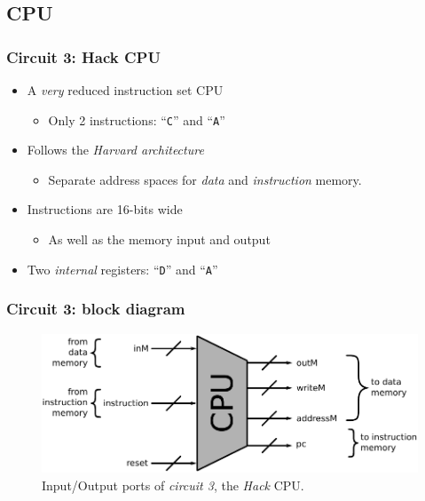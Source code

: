 \documentclass{beamer}
\begin{document}
        \subsection{CPU}
        \label{subsec:cpu}
            \begin{frame}
                \frametitle{Circuit 3: Hack CPU}

                \begin{itemize}
                    \item A \emph{very} reduced instruction set CPU
                        \begin{itemize}
                            \item Only 2 instructions: ``\texttt{C}'' and ``\texttt{A}''
                        \end{itemize}
                    \item Follows the \emph{Harvard architecture}
                        \begin{itemize}
                            \item Separate address spaces for \emph{data} and \emph{instruction} memory.
                        \end{itemize}
                    \item Instructions are 16-bits wide
                        \begin{itemize}
                            \item As well as the memory input and output
                        \end{itemize}
                    \item Two \emph{internal} registers: ``\texttt{D}'' and ``\texttt{A}''
                \end{itemize}
            \end{frame}

            \begin{frame}
                \frametitle{Circuit 3: block diagram}

                \begin{figure}[h!]
                    \centerline{\includegraphics[width=1.0\textwidth]{imgs/cpu-block.pdf}}
                    \caption{Input/Output ports of \emph{circuit 3}, the \emph{Hack} CPU.
                        \label{fig:cpu-block}}
                \end{figure}
            \end{frame}
\end{document}
